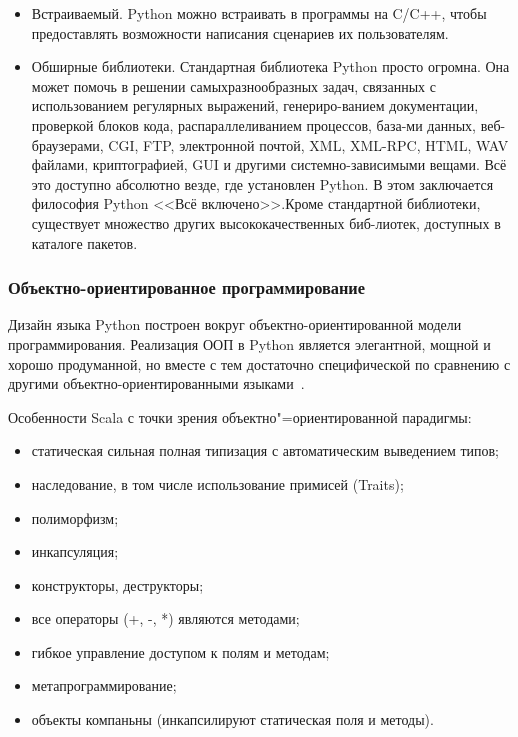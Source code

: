 \begin{itemize}
  \item Встраиваемый. Python можно встраивать в программы на C/C++, чтобы предоставлять возможности написания сценариев их пользователям.
  \item Обширные библиотеки. Стандартная библиотека Python просто огромна. Она может помочь в решении самыхразнообразных задач, связанных с использованием регулярных выражений, генериро-ванием документации, проверкой блоков кода, распараллеливанием процессов, база-ми данных, веб-браузерами, CGI, FTP, электронной почтой, XML, XML-RPC, HTML, WAV файлами, криптографией, GUI и другими системно-зависимыми вещами. Всё это доступно абсолютно везде, где установлен Python. В этом заключается философия Python <<Всё включено>>.Кроме стандартной библиотеки, существует множество других высококачественных биб-лиотек, доступных в каталоге пакетов.
\end{itemize}

\subsubsection{Объектно-ориентированное программирование}
Дизайн языка Python построен вокруг объектно-ориентированной модели программирования. Реализация ООП в Python является элегантной, мощной и хорошо продуманной, но вместе с тем достаточно специфической по сравнению с другими объектно-ориентированными языками~\cite{wiki_python, byte_of_python}.

Особенности Scala с точки зрения объектно"=ориентированной парадигмы:
\begin{itemize}
  \item статическая сильная полная типизация с автоматическим выведением типов;
  \item наследование, в том числе использование примисей (Traits);
  \item полиморфизм;
  \item инкапсуляция;
  \item конструкторы, деструкторы;
  \item все операторы (+, -, *) являются методами;
  \item гибкое управление доступом к полям и методам;
  \item метапрограммирование;
  \item объекты компаньны (инкапсилируют статическая поля и методы).
\end{itemize}

